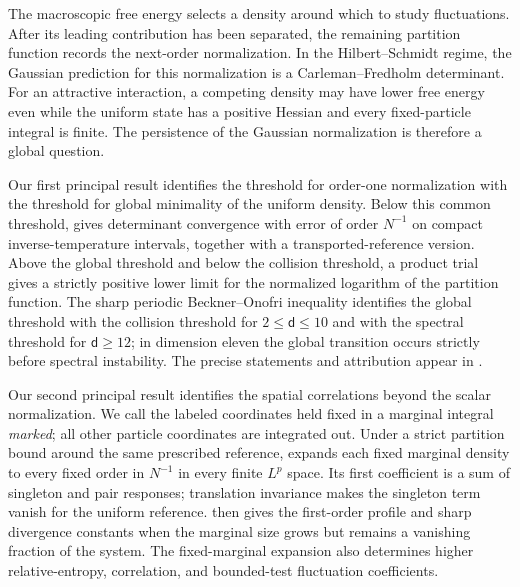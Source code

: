 \documentclass[11pt,reqno]{amsart}
\numberwithin{equation}{section}
\theoremstyle{plain}
\theoremstyle{definition}
\renewcommand{\d}{\mathsf d}
\begin{document}
The macroscopic free energy selects a density around which to study fluctuations. After its leading contribution has been separated, the remaining partition function records the next-order normalization. In the Hilbert--Schmidt regime, the Gaussian prediction for this normalization is a Carleman--Fredholm determinant. For an attractive interaction, a competing density may have lower free energy even while the uniform state has a positive Hessian and every fixed-particle integral is finite. The persistence of the Gaussian normalization is therefore a global question.

Our first principal result identifies the threshold for order-one normalization with the threshold for global minimality of the uniform density. Below this common threshold,  gives determinant convergence with error of order $N^{-1}$ on compact inverse-temperature intervals, together with a transported-reference version. Above the global threshold and below the collision threshold, a product trial gives a strictly positive lower limit for the normalized logarithm of the partition function. The sharp periodic Beckner--Onofri inequality identifies the global threshold with the collision threshold for $2\leq\d\leq10$ and with the spectral threshold for $\d\geq12$; in dimension eleven the global transition occurs strictly before spectral instability. The precise statements and attribution appear in .

Our second principal result identifies the spatial correlations beyond the scalar normalization. We call the labeled coordinates held fixed in a marginal integral \emph{marked}; all other particle coordinates are integrated out. Under a strict partition bound around the same prescribed reference,  expands each fixed marginal density to every fixed order in $N^{-1}$ in every finite $L^p$ space. Its first coefficient is a sum of singleton and pair responses; translation invariance makes the singleton term vanish for the uniform reference.  then gives the first-order profile and sharp divergence constants when the marginal size grows but remains a vanishing fraction of the system. The fixed-marginal expansion also determines higher relative-entropy, correlation, and bounded-test fluctuation coefficients.
\end{document}

